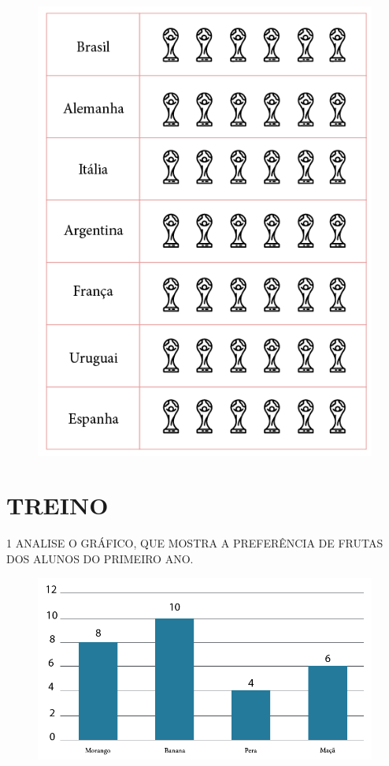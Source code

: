 \pagebreak

\begin{figure}[htpb!]
\centering
\includegraphics[width=\textwidth]{./media/SAEB_1ANO_MAT_FIGURA108.png}
\end{figure}

\section{TREINO}

\num{1} ANALISE O GRÁFICO, QUE MOSTRA A PREFERÊNCIA DE FRUTAS DOS ALUNOS DO PRIMEIRO ANO.

\begin{figure}[htpb!]
\centering
\includegraphics[width=.6\textwidth]{./media/SAEB_1ANO_MAT_FIGURA109.png}
\end{figure}

